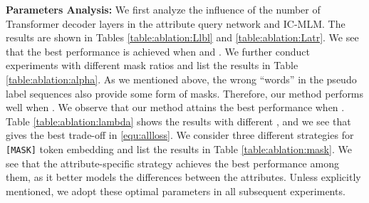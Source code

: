 \documentclass[runningheads]{llncs}
\begin{document}
\textbf{Parameters Analysis:} We first analyze the influence of the number of Transformer decoder layers in the attribute query network and IC-MLM. The results are shown in Tables \ref{table:ablation:Llbl} and \ref{table:ablation:Latr}. We see that the best performance is achieved when  and . We further conduct experiments with different mask ratios  and list the results in Table \ref{table:ablation:alpha}. As we mentioned above, the wrong ``words'' in the pseudo label sequences also provide some form of masks. Therefore, our method performs well when . We observe that our method attains the best performance when . Table \ref{table:ablation:lambda} shows the results with different , and we see that  gives the best trade-off in \eqref{equ:allloss}. We consider three different strategies for \texttt{[MASK]} token embedding and list the results in Table \ref{table:ablation:mask}. We see that the 
attribute-specific strategy achieves the best performance among them, as it better models the differences between the attributes.
Unless explicitly mentioned, we adopt these optimal parameters in all subsequent experiments.
\end{document}
